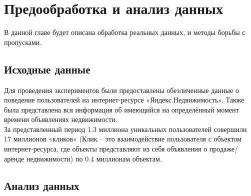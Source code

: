 \newpage
\chapter{Предообработка и анализ данных} \label{ch3}


В данной главе будет описана обработка реальных данных, и методы борьбы с пропусками.
	
\section{Исходные данные} \label{ch3:sec1}

Для проведения экспериментов были предоставлены обезличенные данные о поведение пользователей на интернет-ресурсе «Яндекс.Недвижимость». Также была представлена вся информация об имеющийся на определённый момент времени объявлениях недвижимости.   \\
За представленный период 1.3 миллиона уникальных пользователей совершили 17 миллионов «кликов» (Клик – это взаимодействие пользователя с объектом интернет-ресурса, где объекты представляют из себя объявления о продаже/аренде недвижимости) по 0.4 миллионам объектам.

\section{Анализ данных} \label{ch3:sec2}

